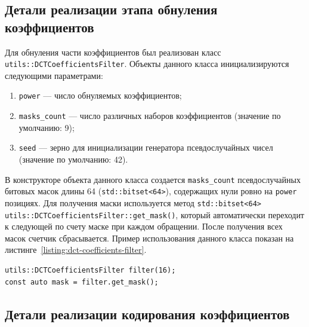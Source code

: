 \documentclass[times,specification,annotation]{itmo-student-thesis}
\begin{document}
\subsection{Детали реализации этапа обнуления коэффициентов}\label{subsection:decoder-implementation-details}

Для обнуления части коэффициентов был реализован класс \texttt{utils::DCTCoefficientsFilter}. Объекты данного класса инициализируются следующими параметрами:
\begin{enumerate}
    \item \texttt{power} --- число обнуляемых коэффициентов;
    \item \texttt{masks\_count} --- число различных наборов коэффициентов (значение по умолчанию: 9);
    \item \texttt{seed} --- зерно для инициализации генератора псевдослучайных чисел (значение по умолчанию: 42).
\end{enumerate}

В конструкторе объекта данного класса создается \texttt{masks\_count} псевдослучайных битовых масок длины 64 (\texttt{std::bitset<64>}), содержащих нули ровно на \texttt{power} позициях. Для получения маски используется метод \texttt{std::bitset<64> utils::DCTCoefficientsFilter::get\_mask()}, который автоматически переходит к следующей по счету маске при каждом обращении. После получения всех масок счетчик сбрасывается. Пример использования данного класса показан на листинге~\ref{listing:dct-coefficients-filter}.

\begin{lstlisting}[float=!h,caption={Пример использования класса для обнуления коэффициентов},label={listing:dct-coefficients-filter}]
utils::DCTCoefficientsFilter filter(16);
const auto mask = filter.get_mask();
\end{lstlisting}

\subsection{Детали реализации кодирования коэффициентов}\label{subsection:residuals-processing-implementation-details}
\end{document}
